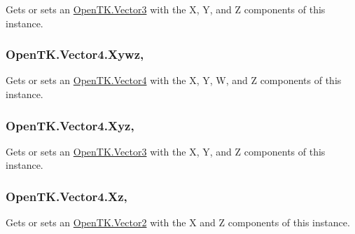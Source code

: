 Gets or sets an \hyperlink{struct_open_t_k_1_1_vector3}{Open\-T\-K.\-Vector3} with the X, Y, and Z components of this instance. 

\hypertarget{struct_open_t_k_1_1_vector4_ac6b6b6787cb704e6efe742dc48ad7544}{
\subsubsection[{Xywz}]{ Open\-T\-K.\-Vector4.\-Xywz\hspace{0.3cm}{\ttfamily [get]}, {\ttfamily [set]}}}\label{struct_open_t_k_1_1_vector4_ac6b6b6787cb704e6efe742dc48ad7544}


Gets or sets an \hyperlink{struct_open_t_k_1_1_vector4}{Open\-T\-K.\-Vector4} with the X, Y, W, and Z components of this instance. 

\hypertarget{struct_open_t_k_1_1_vector4_a2beb4e8e347fa25c8deb8e207c43420c}{
\subsubsection[{Xyz}]{ Open\-T\-K.\-Vector4.\-Xyz\hspace{0.3cm}{\ttfamily [get]}, {\ttfamily [set]}}}\label{struct_open_t_k_1_1_vector4_a2beb4e8e347fa25c8deb8e207c43420c}


Gets or sets an \hyperlink{struct_open_t_k_1_1_vector3}{Open\-T\-K.\-Vector3} with the X, Y, and Z components of this instance. 

\hypertarget{struct_open_t_k_1_1_vector4_a4e9f6d694c35bdcf4285f9bb1aca624f}{
\subsubsection[{Xz}]{ Open\-T\-K.\-Vector4.\-Xz\hspace{0.3cm}{\ttfamily [get]}, {\ttfamily [set]}}}\label{struct_open_t_k_1_1_vector4_a4e9f6d694c35bdcf4285f9bb1aca624f}


Gets or sets an \hyperlink{struct_open_t_k_1_1_vector2}{Open\-T\-K.\-Vector2} with the X and Z components of this instance. 

